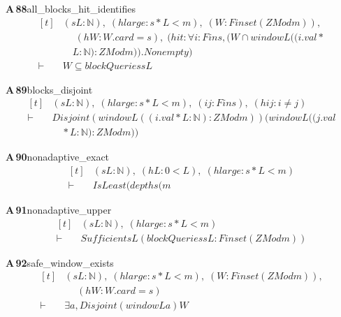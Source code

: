 \documentclass[conference]{IEEEtran}
\theoremstyle{definition}
\newcommand{\lean}[1]{\textsf{\footnotesize #1}}
\begin{document}
\noindent\textbf{A\,88}\quad\lean{all\_blocks\_hit\_identifies}
{\footnotesize\[ \begin{aligned}[t]
&(\mathit{s} \mathit{L} : \mathbb{N} ),\; (\mathit{hlarge} : \mathit{s}*\mathit{L}< \mathit{m}),\; (\mathit{W} : \mathit{Finset} (\mathit{ZMod} \mathit{m})),\\
&\quad \; (\mathit{hW} : \mathit{W}.\mathit{card}=\mathit{s}),\; (\mathit{hit} : \forall \mathit{i} : \mathit{Fin} \mathit{s},(\mathit{W} \cap \mathit{window} \mathit{L} ((\mathit{i}.\mathit{val}*\\
&\quad \mathit{L} : \mathbb{N} ) : \mathit{ZMod} \mathit{m})).\mathit{Nonempty})\\
\vdash\;&\mathit{W} \subseteq \mathit{blockQueries} \mathit{s} \mathit{L}
\end{aligned} \]}

\noindent\textbf{A\,89}\quad\lean{blocks\_disjoint}
{\footnotesize\[ \begin{aligned}[t]
&(\mathit{s} \mathit{L} : \mathbb{N} ),\; (\mathit{hlarge} : \mathit{s}*\mathit{L}< \mathit{m}),\; (\mathit{i} \mathit{j} : \mathit{Fin} \mathit{s}),\; (\mathit{hij} : \mathit{i} \neq \mathit{j})\\
\vdash\;&\mathit{Disjoint} (\mathit{window} \mathit{L} ((\mathit{i}.\mathit{val}*\mathit{L} : \mathbb{N} ) : \mathit{ZMod} \mathit{m})) (\mathit{window} \mathit{L} ((\mathit{j}.\mathit{val}\\
&\quad *\mathit{L} : \mathbb{N} ) : \mathit{ZMod} \mathit{m}))
\end{aligned} \]}

\noindent\textbf{A\,90}\quad\lean{nonadaptive\_exact}
{\footnotesize\[ \begin{aligned}[t]
&(\mathit{s} \mathit{L} : \mathbb{N} ),\; (\mathit{hL} : 0<\mathit{L}),\; (\mathit{hlarge} : \mathit{s}*\mathit{L}< \mathit{m})\\
\vdash\;&\mathit{IsLeast} (\mathit{depths} (\mathit{m}
\end{aligned} \]}

\noindent\textbf{A\,91}\quad\lean{nonadaptive\_upper}
{\footnotesize\[ \begin{aligned}[t]
&(\mathit{s} \mathit{L} : \mathbb{N} ),\; (\mathit{hlarge} : \mathit{s}*\mathit{L}< \mathit{m})\\
\vdash\;&\mathit{Sufficient} \mathit{s} \mathit{L} (\mathit{blockQueries} \mathit{s} \mathit{L} : \mathit{Finset} (\mathit{ZMod} \mathit{m}))
\end{aligned} \]}

\noindent\textbf{A\,92}\quad\lean{safe\_window\_exists}
{\footnotesize\[ \begin{aligned}[t]
&(\mathit{s} \mathit{L} : \mathbb{N} ),\; (\mathit{hlarge} : \mathit{s}*\mathit{L}< \mathit{m}),\; (\mathit{W} : \mathit{Finset} (\mathit{ZMod} \mathit{m})),\\
&\quad \; (\mathit{hW} : \mathit{W}.\mathit{card}=\mathit{s})\\
\vdash\;&\exists \mathit{a},\mathit{Disjoint} (\mathit{window} \mathit{L} \mathit{a}) \mathit{W}
\end{aligned} \]}
\end{document}
